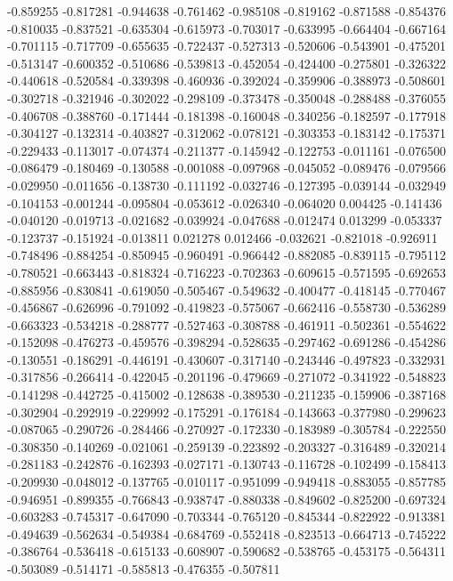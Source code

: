 -0.859255
-0.817281
-0.944638
-0.761462
-0.985108
-0.819162
-0.871588
-0.854376
-0.810035
-0.837521
-0.635304
-0.615973
-0.703017
-0.633995
-0.664404
-0.667164
-0.701115
-0.717709
-0.655635
-0.722437
-0.527313
-0.520606
-0.543901
-0.475201
-0.513147
-0.600352
-0.510686
-0.539813
-0.452054
-0.424400
-0.275801
-0.326322
-0.440618
-0.520584
-0.339398
-0.460936
-0.392024
-0.359906
-0.388973
-0.508601
-0.302718
-0.321946
-0.302022
-0.298109
-0.373478
-0.350048
-0.288488
-0.376055
-0.406708
-0.388760
-0.171444
-0.181398
-0.160048
-0.340256
-0.182597
-0.177918
-0.304127
-0.132314
-0.403827
-0.312062
-0.078121
-0.303353
-0.183142
-0.175371
-0.229433
-0.113017
-0.074374
-0.211377
-0.145942
-0.122753
-0.011161
-0.076500
-0.086479
-0.180469
-0.130588
-0.001088
-0.097968
-0.045052
-0.089476
-0.079566
-0.029950
-0.011656
-0.138730
-0.111192
-0.032746
-0.127395
-0.039144
-0.032949
-0.104153
-0.001244
-0.095804
-0.053612
-0.026340
-0.064020
0.004425
-0.141436
-0.040120
-0.019713
-0.021682
-0.039924
-0.047688
-0.012474
0.013299
-0.053337
-0.123737
-0.151924
-0.013811
0.021278
0.012466
-0.032621
-0.821018
-0.926911
-0.748496
-0.884254
-0.850945
-0.960491
-0.966442
-0.882085
-0.839115
-0.795112
-0.780521
-0.663443
-0.818324
-0.716223
-0.702363
-0.609615
-0.571595
-0.692653
-0.885956
-0.830841
-0.619050
-0.505467
-0.549632
-0.400477
-0.418145
-0.770467
-0.456867
-0.626996
-0.791092
-0.419823
-0.575067
-0.662416
-0.558730
-0.536289
-0.663323
-0.534218
-0.288777
-0.527463
-0.308788
-0.461911
-0.502361
-0.554622
-0.152098
-0.476273
-0.459576
-0.398294
-0.528635
-0.297462
-0.691286
-0.454286
-0.130551
-0.186291
-0.446191
-0.430607
-0.317140
-0.243446
-0.497823
-0.332931
-0.317856
-0.266414
-0.422045
-0.201196
-0.479669
-0.271072
-0.341922
-0.548823
-0.141298
-0.442725
-0.415002
-0.128638
-0.389530
-0.211235
-0.159906
-0.387168
-0.302904
-0.292919
-0.229992
-0.175291
-0.176184
-0.143663
-0.377980
-0.299623
-0.087065
-0.290726
-0.284466
-0.270927
-0.172330
-0.183989
-0.305784
-0.222550
-0.308350
-0.140269
-0.021061
-0.259139
-0.223892
-0.203327
-0.316489
-0.320214
-0.281183
-0.242876
-0.162393
-0.027171
-0.130743
-0.116728
-0.102499
-0.158413
-0.209930
-0.048012
-0.137765
-0.010117
-0.951099
-0.949418
-0.883055
-0.857785
-0.946951
-0.899355
-0.766843
-0.938747
-0.880338
-0.849602
-0.825200
-0.697324
-0.603283
-0.745317
-0.647090
-0.703344
-0.765120
-0.845344
-0.822922
-0.913381
-0.494639
-0.562634
-0.549384
-0.684769
-0.552418
-0.823513
-0.664713
-0.745222
-0.386764
-0.536418
-0.615133
-0.608907
-0.590682
-0.538765
-0.453175
-0.564311
-0.503089
-0.514171
-0.585813
-0.476355
-0.507811
